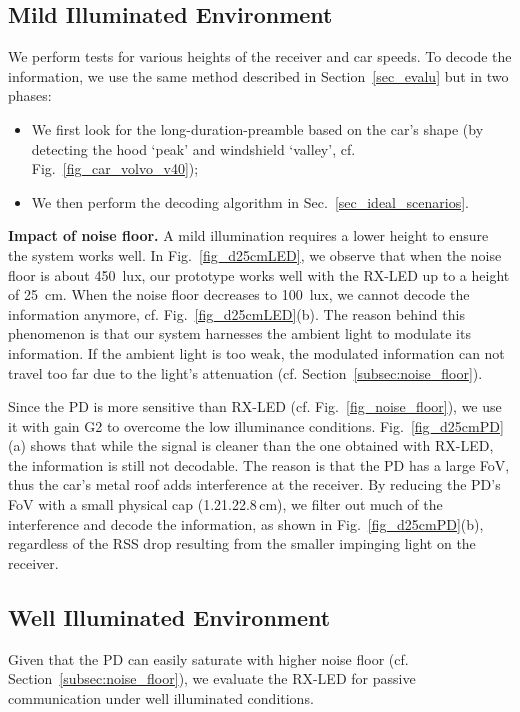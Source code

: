 \documentclass[10pt]{sig-alternate-05-2015}
\begin{document}
{\vspace{-1mm}
\subsection{Mild Illuminated Environment}
We perform tests for various heights of the receiver and car speeds. To decode the information, we use the same method described in Section~\ref{sec_evalu} but in two phases:
\begin{itemize}
	\item We first look for the long-duration-preamble based on the car's shape (by detecting the hood `peak' and windshield `valley', cf. Fig.~\ref{fig_car_volvo_v40});
	\item We then perform the decoding algorithm in Sec.~\ref{sec_ideal_scenarios}.
\end{itemize}

\textbf{Impact of noise floor.}
A mild illumination requires a lower height to ensure the system works well. In Fig.~\ref{fig_d25cmLED}, we observe that when the noise floor is about 450~lux, our prototype works well with the RX-LED up to a height of 25~cm. When the noise floor decreases to 100~lux, we cannot decode the information anymore, cf. Fig.~\ref{fig_d25cmLED}(b). The reason behind this phenomenon is that our system harnesses the ambient light to modulate its information. If the ambient light is too weak, the modulated information can not travel too far due to the light's attenuation (cf. Section~\ref{subsec:noise_floor}).

Since the PD is more sensitive than RX-LED (cf. Fig.~\ref{fig_noise_floor}), we use it with gain G2 to overcome the low illuminance conditions. Fig.~\ref{fig_d25cmPD}(a) shows that while the signal is cleaner than the one obtained with RX-LED, the information is still not decodable. The reason is that the PD has a large FoV, thus the car's metal roof adds interference at the receiver. By reducing the PD's FoV with a small physical cap (1.21.22.8\,cm), we filter out much of the interference and decode the information, as shown in Fig.~\ref{fig_d25cmPD}(b), regardless of the RSS drop resulting from the smaller impinging light on the receiver.

\vspace{-1mm}
\subsection{Well Illuminated Environment}

Given that the PD can easily saturate with higher noise floor (cf. Section~\ref{subsec:noise_floor}), we evaluate the RX-LED for passive communication under well illuminated conditions.

}
\end{document}
